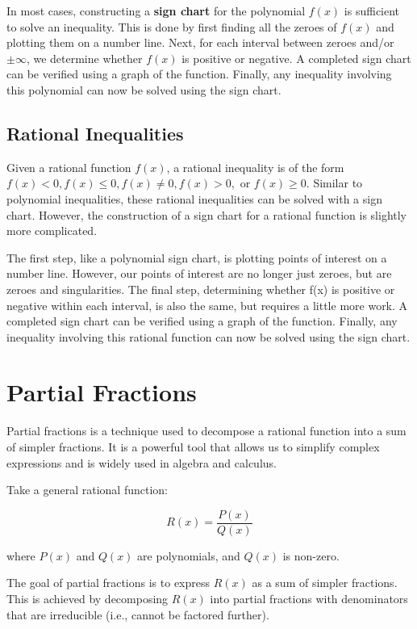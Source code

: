 \documentclass[11pt]{article}
\begin{document}
In most cases, constructing a \textbf{sign chart} for the polynomial $f(x)$ is sufficient to solve an inequality. This is done by first finding all the zeroes of $f(x)$ and plotting them on a number line. Next, for each interval between zeroes and/or $\pm \infty$, we determine whether $f(x)$ is positive or negative. A completed sign chart can be verified using a graph of the function. Finally, any inequality involving this polynomial can now be solved using the sign chart.

\subsection{Rational Inequalities}
Given a rational function $f(x)$, a rational inequality is of the form $f(x)<0, f(x)\leq 0, f(x)\neq 0, f(x)>0, $ or $f(x)\geq 0$. Similar to polynomial inequalities, these rational inequalities can be solved with a sign chart. However, the construction of a sign chart for a rational function is slightly more complicated.

The first step, like a polynomial sign chart, is plotting points of interest on a number line. However, our points of interest are no longer just zeroes, but are zeroes and singularities. The final step, determining whether f(x) is positive or negative within each interval, is also the same, but requires a little more work. A completed sign chart can be verified using a graph of the function. Finally, any inequality involving this rational function can now be solved using the sign chart.

\section{Partial Fractions}

Partial fractions is a technique used to decompose a rational function into a sum of simpler fractions. It is a powerful tool that allows us to simplify complex expressions and is widely used in algebra and calculus. 

Take a general rational function:

\[
R(x) = \frac{P(x)}{Q(x)}
\]

where $P(x)$ and $Q(x)$ are polynomials, and $Q(x)$ is non-zero.

The goal of partial fractions is to express $R(x)$ as a sum of simpler fractions. This is achieved by decomposing $R(x)$ into partial fractions with denominators that are irreducible (i.e., cannot be factored further).
\end{document}
